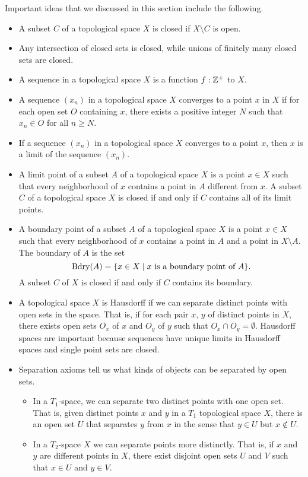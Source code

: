\label{sec_closed_sets_top_summ}
Important ideas that we discussed in this section include the following.
\begin{itemize}
\item A subset $C$ of a topological space $X$ is closed if $X \setminus C$ is open.
\item Any intersection of closed sets is closed, while unions of finitely many closed sets are closed. 
\item A sequence in a topological space $X$ is a function $f: \mathbb{Z}^+$ to $X$.
\item A sequence $(x_n)$ in a topological space $X$ converges to a point $x$ in $X$ if for each open set $O$ containing $x$, there exists a positive integer $N$ such that $x_n \in O$ for all $n \geq N$. 
\item If a sequence $(x_n)$ in a topological space $X$ converges to a point $x$, then $x$ is a limit of the sequence $(x_n)$. 
\item A limit point of a subset $A$ of a topological space $X$ is a point $x \in X$ such that every neighborhood of $x$ contains a point in $A$ different from $x$. A subset $C$ of a topological space $X$ is closed if and only if $C$ contains all of its limit points.   
\item A boundary point of a subset $A$ of a topological space $X$ is a point $x \in X$ such that every neighborhood of $x$ contains a point in $A$ and a point in $X \setminus A$. The boundary of $A$ is the set 
\[\text{Bdry}(A) = \{x \in X \mid x \text{ is a boundary point of } A\}.\]
A subset $C$ of $X$ is closed if and only if $C$ contains its boundary. 
\item A topological space $X$ is Hausdorff if we can separate distinct points with open sets in the space. That is, if for each pair $x$, $y$ of distinct points in $X$, there exists open sets $O_x$ of $x$ and $O_y$ of $y$ such that $O_x \cap O_y = \emptyset$. 
Hausdorff spaces are important because sequences have unique limits in Hausdorff spaces and single point sets are closed. 
\item Separation axioms tell us what kinds of objects can be separated by open sets. 
	\begin{itemize}
	\item In a $T_1$-space, we can separate two distinct points with one open set. That is, given distinct points $x$ and $y$ in a $T_1$ topological space $X$, there is an open set $U$ that separates $y$ from $x$ in the sense that $y \in U$ but $x \notin U$. 
	\item In a $T_2$-space $X$ we can separate points more distinctly. That is, if $x$ and $y$ are different points in $X$, there exist disjoint open sets $U$ and $V$ such that $x \in U$ and $y \in V$. 

\end{itemize}
\end{itemize}
